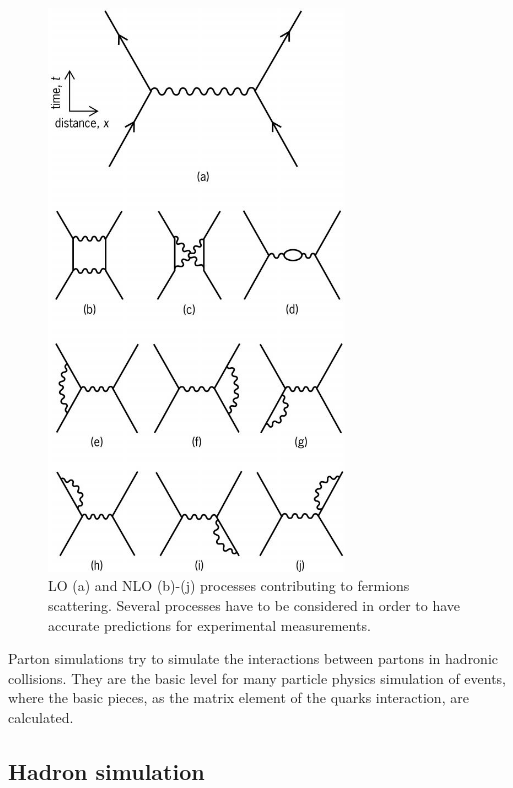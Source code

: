 \begin{figure}[!Hhtbp]
  \begin{center}
    \includegraphics[width=0.7\textwidth]{figs/Feynman_diagrams.jpg}
    \caption{LO (a) and NLO (b)-(j) processes contributing to fermions scattering. Several processes have to be considered in order to have accurate predictions for experimental measurements.}
    \label{fig:LOpNLO}
  \end{center}
\end{figure}

Parton simulations try to simulate the interactions between partons in hadronic collisions. They are the basic level for many particle physics simulation of events, where the basic pieces, as the matrix element of the quarks interaction, are calculated.

\subsection{Hadron simulation}
\label{sec:hadron}

